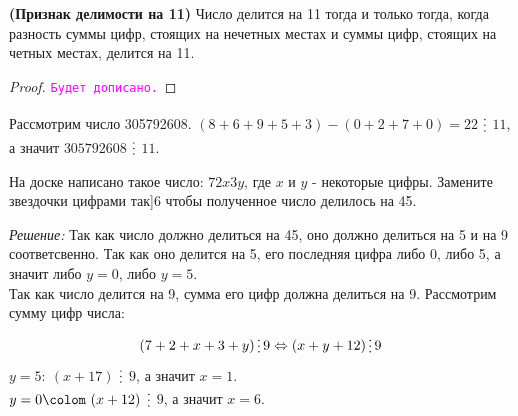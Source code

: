\documentclass[11pt]{article}
\begin{document}
\begin{theorem} \textbf{(Признак делимости на 11)}
    Число делится на 11 тогда и только тогда, когда разность суммы цифр, стоящих на нечетных местах и суммы цифр, стоящих на четных местах, делится на 11.
\end{theorem}
\begin{proof}
    \textcolor{magenta}{\texttt{Будет дописано.}}
\end{proof}

\begin{example}
	Рассмотрим число 305792608. $(8 + 6 + 9 + 5 + 3) - (0 + 2 + 7 + 0) = 22$ $\divisible$ $11$, а значит $305792608$ $\divisible$ $11$.
\end{example}

\begin{example}
	На доске написано  такое число: $72x3y$, где $x$ и $y$ - некоторые цифры. Замените звездочки цифрами так]6 чтобы полученное число делилось на 45.
\end{example}
\textit{Решение:}
Так как число должно делиться на 45, оно должно делиться на 5 и на 9 соответсвенно.
Так как оно делится на 5, его последняя цифра либо 0, либо 5, а значит либо $y = 0$, либо $y = 5$. \\
Так как число делится на 9, сумма его цифр должна делиться на 9. Рассмотрим сумму цифр числа:
\[ (7 + 2 + x + 3 + y) \divisible 9 \Leftrightarrow (x + y + 12) \divisible 9\]
$y = 5\colon \ (x + 17)$ $\divisible$ $9$, а значит $x = 1$.\\
$y = 0\colom \ (x + 12)$ $\divisible$ $9$, а значит $x = 6$.\\
\end{document}
